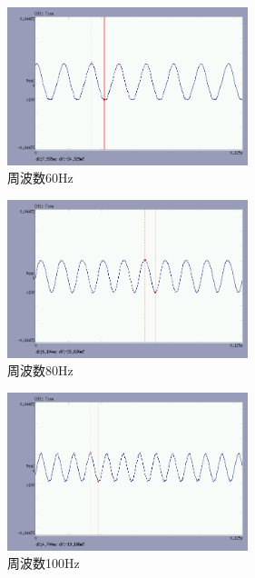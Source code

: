 \documentclass[twocolumn, 10pt, a4j]{jsarticle}
\begin{document}
      \begin{figure}[H]
        \begin{center}
          \includegraphics[width=7cm]{../img/experiments/003.png}
          \caption{周波数60Hz}
        \end{center}
      \end{figure}
      \begin{figure}[H]
        \begin{center}
          \includegraphics[width=7cm]{../img/experiments/004.png}
          \caption{周波数80Hz}
        \end{center}
      \end{figure}
      \begin{figure}[H]
        \begin{center}
          \includegraphics[width=7cm]{../img/experiments/005.png}
          \caption{周波数100Hz}
        \end{center}
      \end{figure}

  
\end{document}

